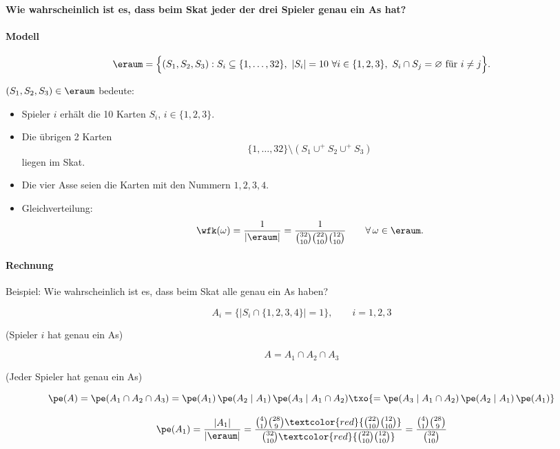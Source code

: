 \begin{bsp}
    \textbf{Wie wahrscheinlich ist es, dass beim Skat jeder der drei Spieler genau ein As hat?} 

    \paragraph{Modell}
    \[
        \eraum
        =
        \Bigl\{
        (S_1,S_2,S_3)
        :
        S_i \subseteq \{1,\dots,32\},
        \ |S_i|=10
        \ \forall i\in\{1,2,3\},
        \ S_i \cap S_j = \varnothing \text{ für } i\neq j
        \Bigr\}.
    \]

    \((S_1,S_2,S_3)\in\eraum\) bedeute:
    \begin{itemize}
        \item Spieler \(i\) erhält die 10 Karten \(S_i\), \(i\in\{1,2,3\}\).
        \item Die übrigen 2 Karten
        \[
            \{1,\dots,32\}\setminus(S_1\cup^+ S_2\cup^+ S_3)
        \]
        liegen im Skat.
        \item Die vier Asse seien die Karten mit den Nummern \(1,2,3,4\).
        \item Gleichverteilung:
        \[
            \wfk(\omega)
            =
            \frac{1}{|\eraum|}
            =
            \frac{1}
            {\binom{32}{10}\binom{22}{10}\binom{12}{10}}
            \qquad \forall\, \omega\in\eraum.
        \]
    \end{itemize}

    \paragraph{Rechnung}
    Beispiel: Wie wahrscheinlich ist es, dass beim Skat alle genau ein As haben?


    \[
        A_i=\bigl\{|S_i\cap\{1,2,3,4\}|=1\bigr\},
        \qquad i=1,2,3
    \]

    (Spieler \(i\) hat genau ein As)

    \[
        A=A_1\cap A_2\cap A_3
    \]

    (Jeder Spieler hat genau ein As)

    \[
        \pe(A)
        =
        \pe(A_1\cap A_2\cap A_3)
        =
        \pe(A_1)\,\pe(A_2\mid A_1)\,\pe(A_3\mid A_1\cap A_2) \txo{= \pe(A_3\mid A_1\cap A_2)\,\pe(A_2\mid A_1)\,\pe(A_1)}
    \]

    \[
        \pe(A_1)
        =
        \frac{|A_1|}{|\eraum|}
        =
        \frac{\binom{4}{1}\binom{28}{9}\textcolor{red}{\binom{22}{10}\binom{12}{10}}}
        {\binom{32}{10}\textcolor{red}{\binom{22}{10}\binom{12}{10}}}
        =
        \frac{\binom{4}{1}\binom{28}{9}}
        {\binom{32}{10}}
    \]


\end{bsp}
